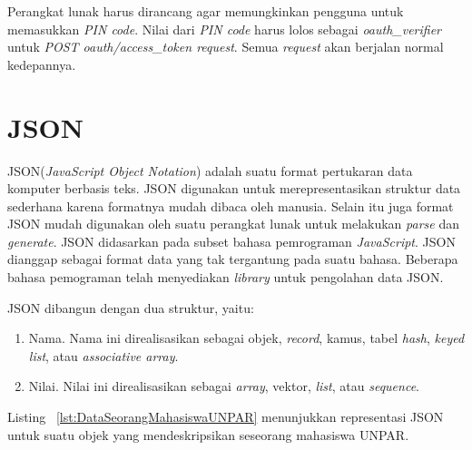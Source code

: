 Perangkat lunak harus dirancang agar memungkinkan pengguna untuk memasukkan \textit{PIN code}. Nilai dari \textit{PIN code} harus lolos sebagai \textit{oauth\_verifier} untuk \textit{POST oauth/access\_token request}. Semua \textit{request} akan berjalan normal kedepannya.

\section{JSON\cite{Json}}
JSON(\textit{JavaScript Object Notation}) adalah suatu format pertukaran data komputer berbasis teks. JSON digunakan untuk merepresentasikan struktur data sederhana karena formatnya mudah dibaca oleh manusia. Selain itu juga format JSON mudah digunakan oleh suatu perangkat lunak  untuk melakukan \textit{parse} dan \textit{generate}. JSON didasarkan pada subset bahasa pemrograman \textit{JavaScript}. JSON dianggap sebagai format data yang tak tergantung pada suatu bahasa. Beberapa bahasa pemograman telah menyediakan \textit{library} untuk pengolahan data JSON.

JSON dibangun dengan dua struktur, yaitu:
\begin{enumerate}
	\item Nama. Nama ini direalisasikan sebagai objek, \textit{record}, kamus, tabel \textit{hash}, \textit{keyed list}, atau \textit{associative array}.
	\item Nilai. Nilai ini direalisasikan sebagai \textit{array}, vektor, \textit{list}, atau \textit{sequence}.
\end{enumerate}

Listing ~\ref{lst:DataSeorangMahasiswaUNPAR} menunjukkan representasi JSON untuk suatu objek yang mendeskripsikan seseorang mahasiswa UNPAR.

